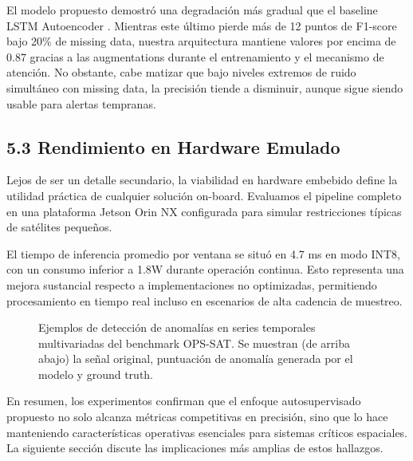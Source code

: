 El modelo propuesto demostró una degradación más gradual que el baseline LSTM Autoencoder \cite{Xu2022_LSTM}. Mientras este último pierde más de 12 puntos de F1-score bajo 20\% de missing data, nuestra arquitectura mantiene valores por encima de 0.87 gracias a las augmentations durante el entrenamiento y el mecanismo de atención. No obstante, cabe matizar que bajo niveles extremos de ruido simultáneo con missing data, la precisión tiende a disminuir, aunque sigue siendo usable para alertas tempranas.

\subsection{5.3 Rendimiento en Hardware Emulado}

Lejos de ser un detalle secundario, la viabilidad en hardware embebido define la utilidad práctica de cualquier solución on-board. Evaluamos el pipeline completo en una plataforma Jetson Orin NX configurada para simular restricciones típicas de satélites pequeños.

El tiempo de inferencia promedio por ventana se situó en 4.7 ms en modo INT8, con un consumo inferior a 1.8W durante operación continua. Esto representa una mejora sustancial respecto a implementaciones no optimizadas, permitiendo procesamiento en tiempo real incluso en escenarios de alta cadencia de muestreo. 

\begin{figure}[h]
\centering
\scalebox{0.6}{}
\caption{Ejemplos de detección de anomalías en series temporales multivariadas del benchmark OPS-SAT. Se muestran (de arriba abajo) la señal original, puntuación de anomalía generada por el modelo y ground truth.}
\label{fig:detection_examples}
\end{figure}

En resumen, los experimentos confirman que el enfoque autosupervisado propuesto no solo alcanza métricas competitivas en precisión, sino que lo hace manteniendo características operativas esenciales para sistemas críticos espaciales. La siguiente sección discute las implicaciones más amplias de estos hallazgos.